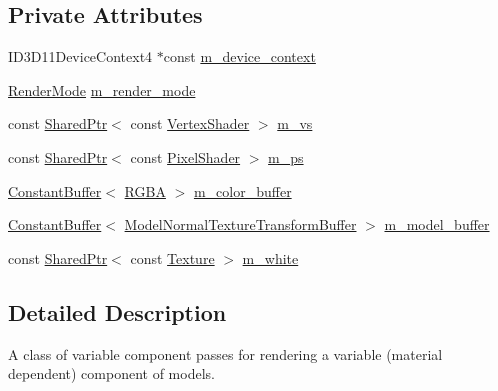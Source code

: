 \subsection*{Private Attributes}
\begin{DoxyCompactItemize}
\item 
I\+D3\+D11\+Device\+Context4 $\ast$const \hyperlink{classmage_1_1_variable_component_pass_ae4929d1a04aba3457e04e5e50754c138}{m\+\_\+device\+\_\+context}
\item 
\hyperlink{namespacemage_a5e7e18b0154373ce8fc942fe3f6b27fd}{Render\+Mode} \hyperlink{classmage_1_1_variable_component_pass_a6e9a67c5251951f887d64c1a6d50a33c}{m\+\_\+render\+\_\+mode}
\item 
const \hyperlink{namespacemage_a1e01ae66713838a7a67d30e44c67703e}{Shared\+Ptr}$<$ const \hyperlink{classmage_1_1_vertex_shader}{Vertex\+Shader} $>$ \hyperlink{classmage_1_1_variable_component_pass_a56ea86a6f78940fae934542eebdcb9e5}{m\+\_\+vs}
\item 
const \hyperlink{namespacemage_a1e01ae66713838a7a67d30e44c67703e}{Shared\+Ptr}$<$ const \hyperlink{namespacemage_a27ecaf266420ee7a494d64edc0757129}{Pixel\+Shader} $>$ \hyperlink{classmage_1_1_variable_component_pass_a005eac17e55f81d3bc8b5989400ed087}{m\+\_\+ps}
\item 
\hyperlink{structmage_1_1_constant_buffer}{Constant\+Buffer}$<$ \hyperlink{structmage_1_1_r_g_b_a}{R\+G\+BA} $>$ \hyperlink{classmage_1_1_variable_component_pass_af99edabaf2e1989feda0f8321dc96e87}{m\+\_\+color\+\_\+buffer}
\item 
\hyperlink{structmage_1_1_constant_buffer}{Constant\+Buffer}$<$ \hyperlink{structmage_1_1_model_normal_texture_transform_buffer}{Model\+Normal\+Texture\+Transform\+Buffer} $>$ \hyperlink{classmage_1_1_variable_component_pass_a2ddb72a3c1464e7ab0f788df25ae733a}{m\+\_\+model\+\_\+buffer}
\item 
const \hyperlink{namespacemage_a1e01ae66713838a7a67d30e44c67703e}{Shared\+Ptr}$<$ const \hyperlink{classmage_1_1_texture}{Texture} $>$ \hyperlink{classmage_1_1_variable_component_pass_a2b018f6481e6e5aa043223ce6821725d}{m\+\_\+white}
\end{DoxyCompactItemize}


\subsection{Detailed Description}
A class of variable component passes for rendering a variable (material dependent) component of models. 

